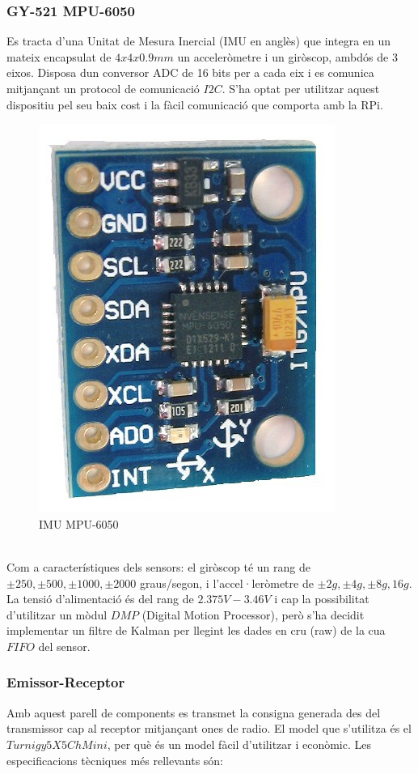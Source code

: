 \documentclass[twoside]{article}
\begin{document}
\subsubsection*{GY-521 MPU-6050}
Es tracta d'una Unitat de Mesura Inercial (IMU en anglès) que integra en un mateix encapsulat de $4x4x0.9mm$ un acceleròmetre i un giròscop, ambdós de 3 eixos. Disposa dun conversor ADC de 16 bits per a cada eix i es comunica mitjançant un protocol de comunicació $I2C$. S'ha optat per utilitzar aquest dispositiu pel seu baix cost i la fàcil comunicació que comporta amb la RPi.
\begin{figure}[h!]
\begin{center}
\includegraphics[scale=0.12]{images/mpu-6050.jpg} 
\caption{IMU MPU-6050}
\end{center}
\end{figure}\\
Com a característiques dels sensors: el giròscop té un rang de  $\pm250,\pm500,\pm1000,\pm2000$ graus/segon, i l'accel·leròmetre de $\pm2g,\pm4g,\pm8g,16g$. La tensió d'alimentació és del rang de $2.375V-3.46V$ i cap la possibilitat d'utilitzar un mòdul $DMP$ (Digital Motion Processor), però s'ha decidit implementar un filtre de Kalman per llegint les dades en cru (raw) de la cua $FIFO$ del sensor.

\subsubsection*{Emissor-Receptor}
Amb aquest parell de components es transmet la consigna generada des del transmissor cap al receptor mitjançant ones de radio. El model que s'utilitza és el $Turnigy 5X 5Ch Mini$, per què és un model fàcil d'utilitzar i econòmic. Les especificacions tècniques més rellevants són: 
\end{document}
